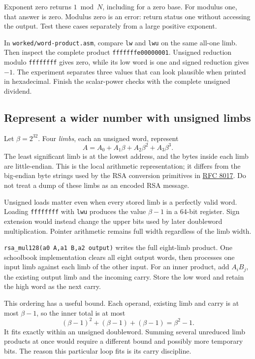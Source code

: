 Exponent zero returns $1\bmod N$, including for a zero base. For modulus one,
that answer is zero. Modulus zero is an error: return status one without
accessing the output. Test these cases separately from a large positive exponent.

In \texttt{worked/word-product.asm}, compare \texttt{lw} and \texttt{lwu}
on the same all-one limb. Then inspect the complete product
\texttt{fffffffe00000001}. Unsigned reduction modulo \texttt{ffffffff}
gives zero, while its low word is one and signed reduction gives $-1$. The
experiment separates three values that can look plausible when printed in
hexadecimal. Finish the scalar-power checks with the complete unsigned dividend.

\subsection*{Represent a wider number with unsigned limbs}

Let $\beta=2^{32}$. Four \emph{limbs}, each an unsigned word, represent
\[
  A=A_0+A_1\beta+A_2\beta^2+A_3\beta^3.
\]
The least significant limb is at the lowest address, and the bytes inside each
limb are little-endian. This is the local arithmetic representation; it differs
from the big-endian byte strings used by the RSA conversion primitives in
\href{https://www.rfc-editor.org/rfc/rfc8017.html}{RFC 8017}.
Do not treat a dump of these limbs as an encoded RSA message.

Unsigned loads matter even when every stored limb is a perfectly valid word.
Loading \texttt{ffffffff} with \texttt{lwu} produces the value $\beta-1$ in a
64-bit register. Sign extension would instead change the upper bits used by
later doubleword multiplication. Pointer arithmetic remains full width regardless
of the limb width.

\texttt{rsa\_mul128(a0 A,a1 B,a2 output)} writes the full eight-limb product.
One schoolbook implementation clears all eight output words, then processes one
input limb against each limb of the other input. For an inner product, add
$A_iB_j$, the existing output limb and the incoming carry. Store the low word
and retain the high word as the next carry.

This ordering has a useful bound. Each operand, existing limb and carry is at
most $\beta-1$, so the inner total is at most
\[
  (\beta-1)^2+(\beta-1)+(\beta-1)=\beta^2-1.
\]
It fits exactly within an unsigned doubleword. Summing several unreduced limb
products at once would require a different bound and possibly more temporary
bits. The reason this particular loop fits is its carry discipline.

